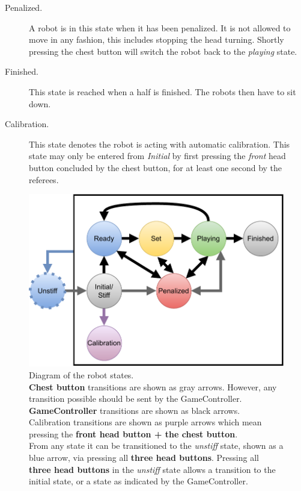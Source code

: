 \begin{description}
  \item[Penalized.] A robot is in this state when it has been penalized. It is not allowed to move in any fashion,  this includes stopping the head turning. Shortly pressing the chest button will switch the robot back to the \emph{playing} state.

  \item[Finished.] This state is reached when a half is finished. The robots then have to sit down.

  \item[Calibration.] This state denotes the robot is acting with automatic calibration. This state may only be entered from \textit{Initial} by first pressing the \textit{front} head button concluded by the chest button, for at least one second by the referees.


\end{description}

\begin{figure}[t]
	\centerline{\includegraphics[width=0.9\columnwidth]{figs/states_new.pdf}}
	\caption{Diagram of the robot states.
    \\\textbf{Chest button} transitions are shown as gray arrows. However, any transition possible should be sent by the GameController.
    \\\textbf{GameController} transitions are shown as black arrows.
    \\Calibration transitions are shown as purple arrows which mean pressing the \textbf{front head button + the chest button}.
    \\From any state it can be transitioned to the \textit{unstiff} state, shown as a blue arrow, via pressing all \textbf{three head buttons}. Pressing all \textbf{three head buttons} in the \textit{unstiff} state allows a transition to the initial state, or a state as indicated by the GameController.}
	\label{fig:robot_states}
\end{figure}

